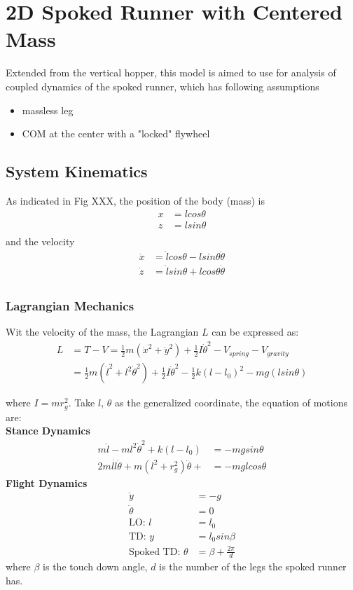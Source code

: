 \section{2D Spoked Runner with Centered Mass}

Extended from the vertical hopper, this model is aimed to use for analysis of coupled dynamics of the spoked runner, which has following assumptions

\begin{itemize}
\item massless leg
\item COM at the center with a "locked" flywheel 
\end{itemize}


\subsection{System Kinematics}
As indicated in Fig XXX, the position of the body (mass) is
\begin{align*}
x &= lcos\theta\\
z &= lsin\theta\\
\end{align*}
and the velocity
\begin{align*}
\dot x &= \dot lcos\theta -lsin\theta\dot \theta\\
\dot z &= \dot lsin\theta + lcos\theta \dot{\theta}\\
\end{align*}





\subsubsection{Lagrangian Mechanics}
Wit the velocity of the mass, the Lagrangian $L$ can be expressed as:
\begin{align*}
L &= T-V = \frac{1}{2}m(\dot x^2+\dot y^2) + \frac{1}{2}I\dot\theta^2 - V_{spring} - V_{gravity}\\
 &= \frac{1}{2}m(\dot l^2 + l^2\dot \theta^2 )+ \frac{1}{2}I\dot\theta^2 - \frac{1}{2}k(l-l_0)^2-mg(lsin\theta)
\end{align*}


\noindent
where $I = mr_g^2$. Take $l$, $\theta$ as the generalized coordinate, the equation of motions are:\\
\noindent
\textbf {Stance Dynamics}
\begin{align*}
m\ddot{l} - ml^2\dot{\theta}^2 + k(l-l_0) &= -mgsin\theta\\
2ml\dot l \dot{\theta} + m(l^2+r_g^2)\ddot{\theta} +   &= -mglcos\theta
\end{align*}
\noindent
\textbf {Flight Dynamics}
\begin{align*}
\ddot y &= -g\\
\ddot \theta &= 0\\
\text{LO: } l &= l_0\\
\text{TD: } y &= l_0sin\beta\\
\text{Spoked TD: } \theta &= \beta + \frac{2\pi}{d}
\end{align*}
where $\beta$ is the touch down angle, $d$ is the number of the legs the spoked runner has.

